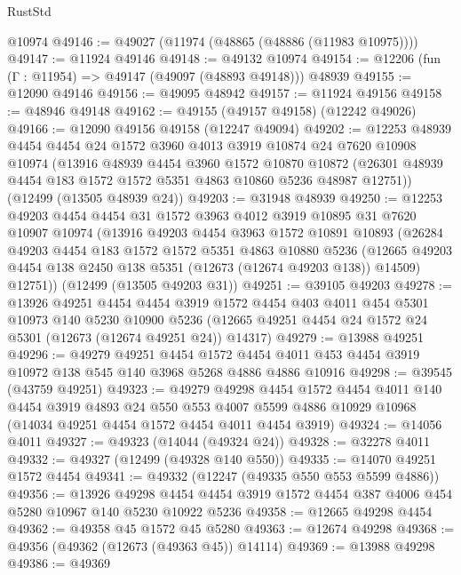 \begin{lexlean}{RustStd}
\begin{coremodule}
{\begin{coremodule}
{{{{{{{{{{{{{{{{{{{{{{{{{{{{{{{{{{{{{{{{{{{{{{{{{{{{{{{{{{{{{{{{{{{{{{{{{{{{{{{{    @10974
@49146 := @49027 (@11974 (@48865 (@48886 (@11983 @10975))))
@49147 := @11924 @49146
@49148 := @49132 @10974
@49154 := @12206 (fun (Γ : @11954) => @49147 (@49097 (@48893 @49148))) @48939
@49155 := @12090 @49146
@49156 := @49095 @48942
@49157 := @11924 @49156
@49158 := @48946 @49148
@49162 := @49155 (@49157 @49158) (@12242 @49026)
@49166 := @12090 @49156 @49158 (@12247 @49094)
@49202 := @12253
    @48939
    @4454
    @4454
    @24
    @1572
    @3960
    @4013
    @3919
    @10874
    @24
    @7620
    @10908
    @10974
    (@13916
      @48939
      @4454
      @3960
      @1572
      @10870
      @10872
      (@26301 @48939 @4454 @183 @1572 @1572 @5351 @4863 @10860 @5236 @48987 @12751))
    (@12499 (@13505 @48939 @24))
@49203 := @31948 @48939
@49250 := @12253
    @49203
    @4454
    @4454
    @31
    @1572
    @3963
    @4012
    @3919
    @10895
    @31
    @7620
    @10907
    @10974
    (@13916
      @49203
      @4454
      @3963
      @1572
      @10891
      @10893
      (@26284
        @49203
        @4454
        @183
        @1572
        @1572
        @5351
        @4863
        @10880
        @5236
        (@12665 @49203 @4454 @138 @2450 @138 @5351 (@12673 (@12674 @49203 @138)) @14509)
        @12751))
    (@12499 (@13505 @49203 @31))
@49251 := @39105 @49203
@49278 := @13926
    @49251
    @4454
    @4454
    @3919
    @1572
    @4454
    @403
    @4011
    @454
    @5301
    @10973
    @140
    @5230
    @10900
    @5236
    (@12665 @49251 @4454 @24 @1572 @24 @5301 (@12673 (@12674 @49251 @24)) @14317)
@49279 := @13988 @49251
@49296 := @49279
    @49251
    @4454
    @1572
    @4454
    @4011
    @453
    @4454
    @3919
    @10972
    @138
    @545
    @140
    @3968
    @5268
    @4886
    @4886
    @10916
@49298 := @39545 (@43759 @49251)
@49323 := @49279
    @49298
    @4454
    @1572
    @4454
    @4011
    @140
    @4454
    @3919
    @4893
    @24
    @550
    @553
    @4007
    @5599
    @4886
    @10929
    @10968
    (@14034 @49251 @4454 @1572 @4454 @4011 @4454 @3919)
@49324 := @14056 @4011
@49327 := @49323 (@14044 (@49324 @24))
@49328 := @32278 @4011
@49332 := @49327 (@12499 (@49328 @140 @550))
@49335 := @14070 @49251 @1572 @4454
@49341 := @49332 (@12247 (@49335 @550 @553 @5599 @4886))
@49356 := @13926
    @49298
    @4454
    @4454
    @3919
    @1572
    @4454
    @387
    @4006
    @454
    @5280
    @10967
    @140
    @5230
    @10922
    @5236
@49358 := @12665 @49298 @4454
@49362 := @49358 @45 @1572 @45 @5280
@49363 := @12674 @49298
@49368 := @49356 (@49362 (@12673 (@49363 @45)) @14114)
@49369 := @13988 @49298
@49386 := @49369
}}}}}}}}}}}}}}}}}}}}}}}}}}}}}}}}}}}}}}}}}}}}}}}}}}}}}}}}}}}}}}}}}}}}}}}}}}}}}}}}
\end{coremodule}}
\end{coremodule}
\end{lexlean}
